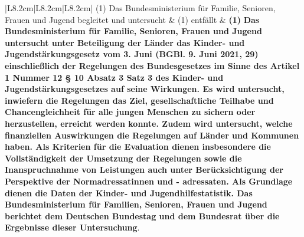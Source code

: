 \documentclass[10pt,a4paper,landscape]{article}
\begin{document}
\begin{longtable}{|L{8.2cm}|L{8.2cm}|L{8.2cm}|}
(1) Das Bundesministerium für Familie,  \newline Senioren, Frauen und Jugend \textcolor{diffred}{begleitet} und  \newline \textcolor{diffred}{untersucht} & (1) \textcolor{diffred}{entfällt} & \textbf{(1) }\textbf{\textcolor{diffgreen}{Das Bundesministerium für Familie,  \newline Senioren, Frauen und Jugend  \newline untersucht unter Beteiligung der Länder  \newline das Kinder- und  \newline Jugendstärkungsgesetz vom 3. Juni   (BGBl. 9. Juni 2021, 29)  \newline einschließlich der Regelungen des  \newline Bundesgesetzes im Sinne des Artikel 1  \newline Nummer 12 \S{} 10 Absatz 3 Satz 3 des  \newline Kinder- und Jugendstärkungsgesetzes  \newline auf seine Wirkungen. Es wird  \newline untersucht, inwiefern die Regelungen  \newline das Ziel, gesellschaftliche Teilhabe und  \newline Chancengleichheit für alle jungen  \newline Menschen zu sichern oder herzustellen,  \newline erreicht werden konnte. Zudem wird  \newline untersucht, welche finanziellen  \newline Auswirkungen die Regelungen auf  \newline Länder und Kommunen haben. Als  \newline Kriterien für die Evaluation dienen  \newline insbesondere die Vollständigkeit der  \newline Umsetzung der Regelungen sowie die  \newline Inanspruchnahme von Leistungen auch  \newline unter Berücksichtigung der Perspektive  \newline der Normadressatinnen und - \newline adressaten. Als Grundlage dienen die }} \textbf{\textcolor{diffgreen}{Daten der Kinder- und  \newline Jugendhilfestatistik. Das  \newline Bundesministerium für Familien,  \newline Senioren, Frauen und Jugend berichtet  \newline dem Deutschen Bundestag und dem  \newline Bundesrat über die Ergebnisse dieser  \newline Untersuchung}}\textcolor{diffgreen}{.} \\

\end{longtable}
\end{document}
